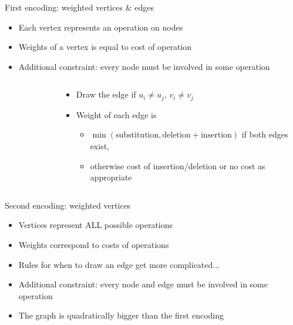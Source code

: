 \documentclass{beamer}
\begin{document}
\begin{frame}{First encoding: weighted vertices \& edges}
  \begin{itemize}
  \item Each vertex represents an operation on nodes
  \item Weights of a vertex is equal to cost of operation
  \item Additional constraint: every node must be involved in some operation
  \end{itemize}
\end{frame}
\begin{frame}
  \begin{columns}
    \begin{column}{0.3\textwidth}
      \begin{figure}
      \end{figure}
    \end{column}
    \begin{column}{0.7\textwidth}
      \begin{itemize}
      \item Draw the edge if $u_i \ne u_j$, $v_i \ne v_j$
      \item Weight of each edge is
        \begin{itemize}
        \item $\min(\text{substitution}, \text{deletion}+\text{insertion})$ if both edges exist,
        \item otherwise cost of insertion/deletion or no cost as appropriate
        \end{itemize}
      \end{itemize}
    \end{column}
  \end{columns}
\end{frame}
\begin{frame}{Second encoding: weighted vertices}
\begin{itemize}
\item Vertices represent ALL possible operations
\item Weights correspond to costs of operations
\item Rules for when to draw an edge get more complicated...
\item Additional constraint: every node and edge must be involved in some operation
\item The graph is quadratically bigger than the first encoding
\end{itemize}
\end{frame}
\end{document}
